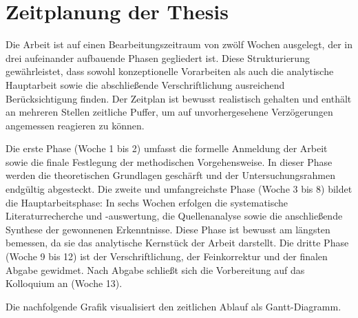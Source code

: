 \section{Zeitplanung der Thesis}

Die Arbeit ist auf einen Bearbeitungszeitraum von zwölf Wochen ausgelegt, der in drei aufeinander aufbauende Phasen gegliedert ist. Diese Strukturierung gewährleistet, dass sowohl konzeptionelle Vorarbeiten als auch die analytische Hauptarbeit sowie die abschlie\ss{}ende Verschriftlichung ausreichend Berücksichtigung finden. Der Zeitplan ist bewusst realistisch gehalten und enthält an mehreren Stellen zeitliche Puffer, um auf unvorhergesehene Verzögerungen angemessen reagieren zu können.

Die erste Phase (Woche 1 bis 2) umfasst die formelle Anmeldung der Arbeit sowie die finale Festlegung der methodischen Vorgehensweise. In dieser Phase werden die theoretischen Grundlagen geschärft und der Untersuchungsrahmen endgültig abgesteckt. Die zweite und umfangreichste Phase (Woche 3 bis 8) bildet die Hauptarbeitsphase: In sechs Wochen erfolgen die systematische Literaturrecherche und -auswertung, die Quellenanalyse sowie die anschlie\ss{}ende Synthese der gewonnenen Erkenntnisse. Diese Phase ist bewusst am längsten bemessen, da sie das analytische Kernstück der Arbeit darstellt. Die dritte Phase (Woche 9 bis 12) ist der Verschriftlichung, der Feinkorrektur und der finalen Abgabe gewidmet. Nach Abgabe schlie\ss{}t sich die Vorbereitung auf das Kolloquium an (Woche 13).

Die nachfolgende Grafik visualisiert den zeitlichen Ablauf als Gantt-Diagramm.

